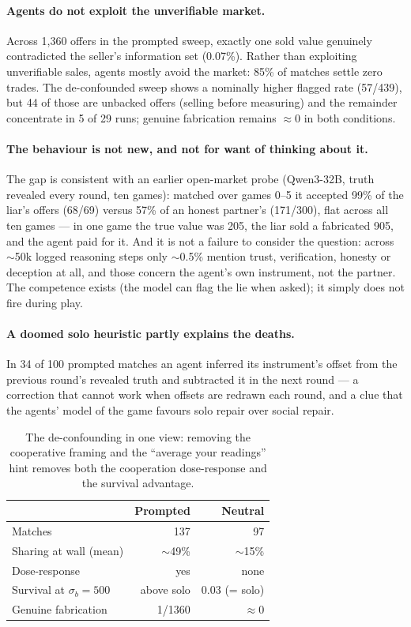 \documentclass[11pt]{article}
\begin{document}
\paragraph{Agents do not exploit the unverifiable market.}
Across 1{,}360 offers in the prompted sweep, exactly one sold value genuinely
contradicted the seller's information set (0.07\%). Rather than exploiting
unverifiable sales, agents mostly avoid the market: 85\% of matches settle
zero trades. The de-confounded sweep shows a nominally higher flagged rate
(57/439), but 44 of those are unbacked offers (selling before measuring) and
the remainder concentrate in 5 of 29 runs; genuine fabrication remains
$\approx$0 in both conditions.

\paragraph{The behaviour is not new, and not for want of thinking about it.}
The gap is consistent with an earlier open-market probe (Qwen3-32B, truth
revealed every round, ten games): matched over games 0--5 it accepted 99\% of
the liar's offers (68/69) versus 57\% of an honest partner's (171/300), flat
across all ten games --- in one game the true value was 205, the liar sold a
fabricated 905, and the agent paid for it. And it is not a failure to consider
the question: across $\sim$50k logged reasoning steps only $\sim$0.5\% mention
trust, verification, honesty or deception at all, and those concern the agent's
own instrument, not the partner. The competence exists (the model can flag the
lie when asked); it simply does not fire during play.

\paragraph{A doomed solo heuristic partly explains the deaths.}
In 34 of 100 prompted matches an agent inferred its instrument's offset from
the previous round's revealed truth and subtracted it in the next round --- a
correction that cannot work when offsets are redrawn each round, and a clue
that the agents' model of the game favours solo repair over social repair.

\begin{table}
  \centering
  \small
  \begin{tabular}{lrr}
    \toprule
    & \textbf{Prompted} & \textbf{Neutral} \\
    \midrule
    Matches & 137 & 97 \\
    Sharing at wall (mean) & $\sim$49\% & $\sim$15\% \\
    Dose-response & yes & none \\
    Survival at $\sigma_b{=}500$ & above solo & 0.03 (= solo) \\
    Genuine fabrication & 1/1360 & $\approx$0 \\
    \bottomrule
  \end{tabular}
  \caption{The de-confounding in one view: removing the cooperative framing
    and the ``average your readings'' hint removes both the cooperation
    dose-response and the survival advantage.}
  \label{tab:deconf}
\end{table}
\end{document}

